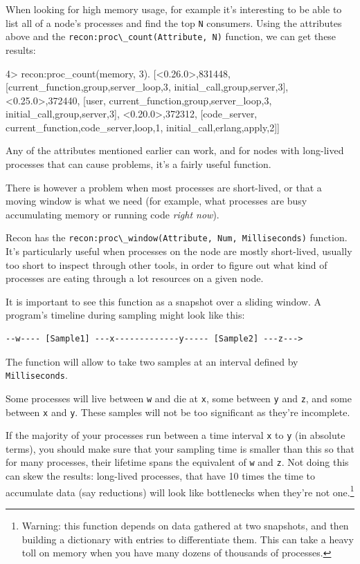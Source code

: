 \documentclass[11pt, oneside]{book}   	%
\newcommand{\function}[1]{\Verb`#1`}
\newcommand{\var}[1]{\Verb`#1`}
\begin{document}
When looking for high memory usage, for example it's interesting to be able to list all of a node's processes and find the top \var{N} consumers. Using the attributes above and the \function{recon:proc\_count(Attribute, N)} function, we can get these results:

\begin{VerbatimEshell}
4> recon:proc_count(memory, 3).
[{<0.26.0>,831448,
  [{current_function,{group,server_loop,3}},
   {initial_call,{group,server,3}}]},
 {<0.25.0>,372440,
  [user,
   {current_function,{group,server_loop,3}},
   {initial_call,{group,server,3}}]},
 {<0.20.0>,372312,
  [code_server,
   {current_function,{code_server,loop,1}},
   {initial_call,{erlang,apply,2}}]}]
\end{VerbatimEshell}

Any of the attributes mentioned earlier can work, and for nodes with long-lived processes that can cause problems, it's a fairly useful function.

There is however a problem when most processes are short-lived, or that a moving window is what we need (for example, what processes are busy accumulating memory or running code \emph{right now}).

Recon has the \function{recon:proc\_window(Attribute, Num, Milliseconds)} function. It's particularly useful when processes on the node are mostly short-lived, usually too short to inspect through other tools, in order to figure out what kind of processes are eating through a lot resources on a given node.

It is important to see this function as a snapshot over a sliding window. A program's timeline during sampling might look like this:

\begin{Verbatim}
--w---- [Sample1] ---x-------------y----- [Sample2] ---z--->
\end{Verbatim}

The function will allow to take two samples at an interval defined by \var{Milliseconds}.

Some processes will live between \var{w} and die at \var{x}, some between \var{y} and \var{z}, and some between \var{x} and \var{y}. These samples will not be too significant as they're incomplete.

If the majority of your processes run between a time interval \var{x} to \var{y} (in absolute terms), you should make sure that your sampling time is smaller than this so that for many processes, their lifetime spans the equivalent of \var{w} and \var{z}. Not doing this can skew the results: long-lived processes, that have 10 times the time to accumulate data (say reductions) will look like bottlenecks when they're not one.\footnote{Warning: this function depends on data gathered at two snapshots, and then building a dictionary with entries to differentiate them. This can take a heavy toll on memory when you have many dozens of thousands of processes.}
\end{document}

